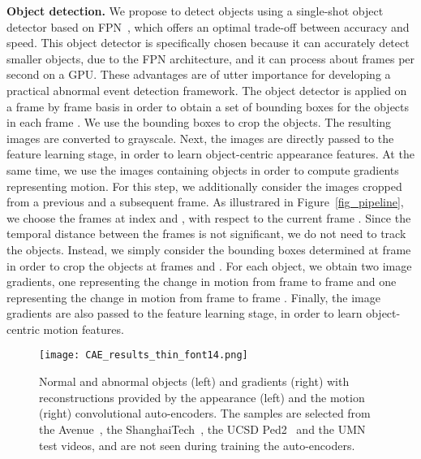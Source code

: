 \documentclass[10pt,twocolumn,letterpaper]{article}
\begin{document}
\noindent
{\bf Object detection.}
We propose to detect objects using a single-shot object detector based on FPN~\cite{Lin-CVPR-2017}, which offers an optimal trade-off between accuracy and speed. This object detector is specifically chosen because  it can accurately detect smaller objects, due to the FPN architecture, and  it can process about  frames per second on a GPU. These advantages are of utter importance for developing a practical abnormal event detection framework. The object detector is applied on a frame by frame basis in order to obtain a set of bounding boxes for the objects in each frame . We use the bounding boxes to crop the objects. The resulting images are converted to grayscale. Next, the images are directly passed to the feature learning stage, in order to learn object-centric appearance features. At the same time, we use the images containing objects in order to compute gradients representing motion. For this step, we additionally consider the images cropped from a previous and a subsequent frame. As illustrared in Figure~\ref{fig_pipeline}, we choose the frames at index  and , with respect to the current frame . Since the temporal distance between the frames is not significant, we do not need to track the objects. Instead, we simply consider the bounding boxes determined at frame  in order to crop the objects at frames  and . For each object, we obtain two image gradients, one representing the change in motion from frame  to frame  and one representing the change in motion from frame  to frame . Finally, the image gradients are also passed to the feature learning stage, in order to learn object-centric motion features.
 
\begin{figure}[!t]

\begin{center}
\texttt{[image: CAE\_results\_thin\_font14.png]}
\end{center}
\vspace*{-0.4cm}
\caption{Normal and abnormal objects (left) and gradients (right) with reconstructions provided by the appearance (left) and the motion (right) convolutional auto-encoders. The samples are selected from the Avenue~\cite{Lu-ICCV-2013}, the ShanghaiTech~\cite{Luo-ICCV-2017}, the UCSD Ped2~\cite{Mahadevan-CVPR-2010} and the UMN~\cite{Mehran-CVPR-2009} test videos, and are not seen during training the auto-encoders.}
\label{fig_cae}
\vspace*{-0.7cm}
\end{figure}
\end{document}
